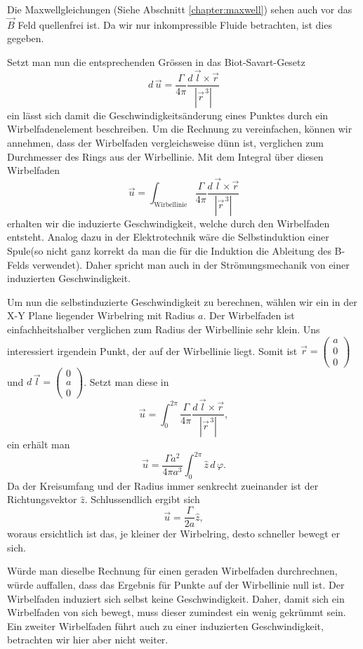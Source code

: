 Die Maxwellgleichungen (Siehe Abschnitt \ref{chapter:maxwell}) sehen auch vor das \(\vec{B}\) Feld quellenfrei ist. 
Da wir nur inkompressible Fluide betrachten, ist dies gegeben.

Setzt man nun die entsprechenden Grössen in das Biot-Savart-Gesetz  
\[
d\, \vec{u}
=
\frac{\Gamma}{4\pi}\frac{d\, \vec{l} \times \vec{r}}{\left\lvert \vec{r}^{\,3}\right\rvert }
\]
ein lässt sich damit die Geschwindigkeitsänderung eines Punktes durch ein Wirbelfadenelement beschreiben.
Um die Rechnung zu vereinfachen, können wir annehmen, dass der Wirbelfaden vergleichsweise dünn ist, verglichen zum Durchmesser des Rings aus der Wirbellinie.
Mit dem Integral über diesen Wirbelfaden
\[
\vec{u}
=
\int_{\text{Wirbellinie}} \frac{\Gamma}{4\pi}\frac{d\, \vec{l} \times \vec{r}}{\left\lvert \vec{r}^{\,3}\right\rvert}
\]
erhalten wir die induzierte Geschwindigkeit, welche durch den Wirbelfaden entsteht.
Analog dazu in der Elektrotechnik wäre die Selbstinduktion einer Spule(so nicht ganz korrekt da man die für die Induktion die Ableitung des B-Felds verwendet).
Daher spricht man auch in der Strömungsmechanik von einer induzierten Geschwindigkeit.

Um nun die selbstinduzierte Geschwindigkeit zu berechnen, wählen wir ein in der X-Y Plane liegender Wirbelring mit Radius \(a\).
Der Wirbelfaden ist einfachheitshalber verglichen zum Radius der Wirbellinie sehr klein.
Uns interessiert irgendein Punkt, der auf der Wirbellinie liegt.
Somit ist
\(
\vec{r} = 
\begin{pmatrix}
    a\\
    0\\
    0    
\end{pmatrix}\)
und
\(
d\,\vec{l} = 
\begin{pmatrix}
    0\\
    a\\
    0    
\end{pmatrix}\). 
Setzt man diese in
\[
\vec{u}
=
\int_{0}^{2\pi} \frac{\Gamma }{4\pi}\frac{d\, \vec{l} \times \vec{r}}{\left\lvert \vec{r}^{\,3}\right\rvert },
\]
ein erhält man 
\[
\vec{u}
=
\frac{\Gamma a^{2}}{4\pi a^{3}} \int_{0}^{2\pi} \hat{z}\, d\,\varphi.
\]
Da der Kreisumfang und der Radius immer senkrecht zueinander ist der Richtungsvektor \(\hat{z}\). 
Schlussendlich ergibt sich
\[
\vec{u}
=
\frac{\Gamma }{2 a}\hat{z},
\]
woraus ersichtlich ist das, je kleiner der Wirbelring, desto schneller bewegt er sich.

Würde man dieselbe Rechnung für einen geraden Wirbelfaden durchrechnen, würde auffallen, dass das Ergebnis für Punkte auf der Wirbellinie null ist.
Der Wirbelfaden induziert sich selbst keine Geschwindigkeit.
Daher, damit sich ein Wirbelfaden von sich bewegt, muss dieser zumindest ein wenig gekrümmt sein.
Ein zweiter Wirbelfaden führt auch zu einer induzierten Geschwindigkeit, betrachten wir hier aber nicht weiter. 

